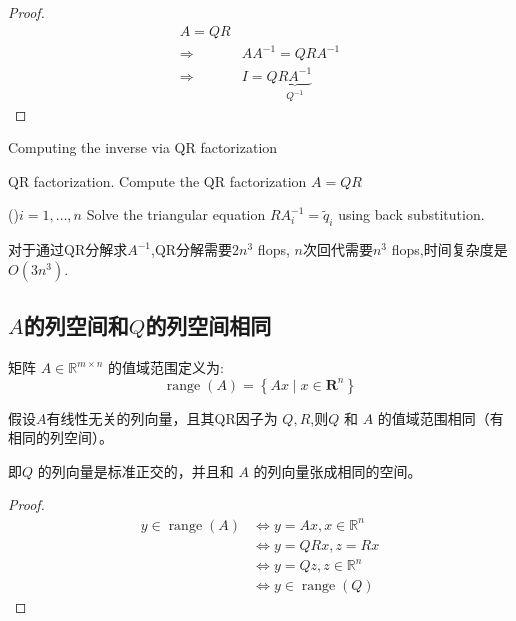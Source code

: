 \begin{proof}
    \begin{equation}\begin{aligned}
        A = QR\\
        \Rightarrow & A A^{-1} = QRA^{-1}\\
        \Rightarrow & I = Q\underbrace{RA^{-1} }_{Q^{-1}}
    \end{aligned}\end{equation}
\end{proof}

\begin{algorithm}[htbp]
    \caption{Computing the inverse via QR factorization}

    QR factorization. Compute the QR factorization $ A=Q R $\;

    \For(){$ i=1, \ldots, n $}{
        Solve the triangular equation $ R A^{-1}_{i}=\tilde{q}_{i} $ using back substitution.
    }
    
\end{algorithm}

对于通过QR分解求$A^{-1}$,QR分解需要$2n^3$ flops, $n$次回代需要$n^3$ flops,时间复杂度是$O(3n^3)$.

\subsection{$A$的列空间和$Q$的列空间相同}

矩阵 $A \in \mathbb{R}^{m \times n}$ 的值域范围定义为:
\begin{equation}
\operatorname{range}(A)=\left\{A x \mid x \in \mathbf{R}^{n}\right\}
\end{equation}

\begin{theorem}
    假设$A$有线性无关的列向量，且其QR因子为 $Q, R$,则$Q$ 和 $A$ 的值域范围相同（有相同的列空间）。

\end{theorem}

即$Q$ 的列向量是标准正交的，并且和 $A$ 的列向量张成相同的空间。

\begin{proof}
    \begin{equation}
\begin{aligned}
y \in \operatorname{range}(A) & \Leftrightarrow  y=A x, x \in \mathbb{R}^{n} \\
& \Leftrightarrow  y=Q R x, z=R x \\
& \Leftrightarrow  y=Q z, z \in \mathbb{R}^{n} \\
& \Leftrightarrow  y \in \operatorname{range}(Q)
\end{aligned}
\end{equation}
\end{proof}

